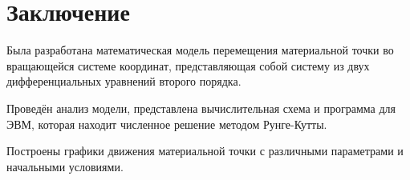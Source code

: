 \chapter{Заключение}
Была разработана математическая модель перемещения материальной точки во вращающейся системе координат, представляющая собой систему из двух дифференциальных уравнений второго порядка.

Проведён анализ модели, представлена вычислительная схема и программа для ЭВМ, которая находит численное решение методом Рунге-Кутты.

Построены графики движения материальной точки с различными параметрами и начальными условиями.

